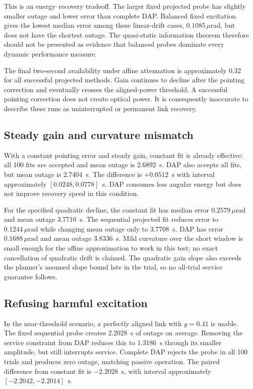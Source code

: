 \documentclass[journal]{IEEEtran}
\newcommand{\um}{\,\mu\mathrm{rad}}
\begin{document}
This is an energy--recovery tradeoff. The larger fixed projected probe has slightly smaller outage and lower error than complete DAP. Balanced fixed excitation gives the lowest median error among these linear-drift cases, $0.1085\um$, but does not have the shortest outage. The quasi-static information theorem therefore should not be presented as evidence that balanced probes dominate every dynamic performance measure.

The final two-second availability under affine attenuation is approximately 0.32 for all successful projected methods. Gain continues to decline after the pointing correction and eventually crosses the aligned-power threshold. A successful pointing correction does not create optical power. It is consequently inaccurate to describe these runs as uninterrupted or permanent link recovery.

\subsection{Steady gain and curvature mismatch}
With a constant pointing error and steady gain, constant fit is already effective: all 100 fits are accepted and mean outage is 2.6892~s. DAP also accepts all fits, but mean outage is 2.7404~s. The difference is $+0.0512$~s with interval approximately $[0.0248,0.0778]$~s. DAP consumes less angular energy but does not improve recovery speed in this condition.

For the specified quadratic decline, the constant fit has median error $0.2579\um$ and mean outage 3.7710~s. The sequential projected fit reduces error to $0.1244\um$ while changing mean outage only to 3.7708~s. DAP has error $0.1688\um$ and mean outage 3.8336~s. Mild curvature over the short window is small enough for the affine approximation to work in this test; no exact cancellation of quadratic drift is claimed. The quadratic gain slope also exceeds the planner's assumed slope bound late in the trial, so no all-trial service guarantee follows.

\subsection{Refusing harmful excitation}
In the near-threshold scenario, a perfectly aligned link with $g=0.41$ is usable. The fixed sequential probe creates 2.2028~s of outage on average. Removing the service constraint from DAP reduces this to 1.3186~s through its smaller amplitude, but still interrupts service. Complete DAP rejects the probe in all 100 trials and produces zero outage, matching passive operation. The paired difference from constant fit is $-2.2028$~s, with interval approximately $[-2.2042,-2.2014]$~s.
\end{document}
